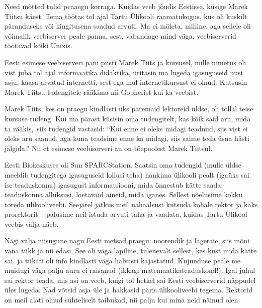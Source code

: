 
Need mõtted tulid peaaegu korraga. Kuidas veeb jõudis Eestisse, 
küsige Marek Tiitsu käest. Tema töötas tol ajal Tartu 
Ülikooli raamatukogus, kus oli kuskilt 
päranduseks või kingitusena saadud arvuti. Ma ei mäleta, milline, aga sellele oli võimalik veebiserver peale panna, sest, 
vabandage mind väga, veebiserverid töötavad kõiki Unixis. 

Eesti esimese veebiserveri pani püsti Marek Tiits 
ja kursusel, mille nimetus oli vist juba tol ajal informaatika 
didaktika, üritasin ma lugeda igasuguseid uusi asju, kaasa arvatud internetti, sest ega mul internetikursust ei olnud. 
Kutsusin Marek Tiitsu tudengitele rääkima nii Gopherist kui 
ka veebist. 

Marek Tiits, kes on praegu kindlasti üks paremaid 
lektoreid üldse, oli tollal teise kursuse tudeng. Kui ma pärast küsisin oma 
tudengitelt, kas kõik said aru, mida ta 
rääkis, siis tudengid vastasid: \enquote{Kui enne ei oleks midagi 
teadnud, siis vist ei oleks aru saanud, aga kuna teadsime enne ka midagi, 
siis saime teda üsna hästi jälgida.} Nii et esimese veebiserveri au on tõepoolest
Marek Tiitsul. 

Eesti Biokeskuses oli Sun SPARCStation. 
Saatsin oma tudengid (mulle üldse meeldib tudengitega igasuguseid 
lollusi teha) hankima ülikooli pealt (igaüks sai ise teaduskonna) 
igasugust informatsiooni, mida õnnestub kätte saada: teaduskonna 
allüksusi, loetavaid aineid, mida iganes. Sellest nõelusime kokku
toreda ülikooliveebi. Seejärel jätkus meil nahaalsust kutsuda kohale 
rektor ja kaks prorektorit -- palusime neil istuda arvuti taha ja vaadata, kuidas 
Tartu Ülikool veebis välja näeb. 


Nägi välja niisugune nagu Eesti metsad praegu: 
noorendik ja lageraie, siis mõni vana tükk ja nii edasi. See oli väga 
lapiline, tulenevalt sellest, kes kust mida kätte sai, ja tükati oli info kindlasti väga halvasti kajastatud. Kujunduse peale me muidugi 
väga palju auru ei raisanud (ikkagi matemaatikateaduskond!). Igal 
juhul sai rektor teada, mis asi on veeb, kuigi tol hetkel sai Eesti veebiserverid
näppudel üles lugeda. Nad võtsid asja üle ja hakkasid päris ülikooliveebi tegema. Rektorid on meil 
alati olnud suhteliselt taibukad, nii palju kui mina neid näinud olen. 

